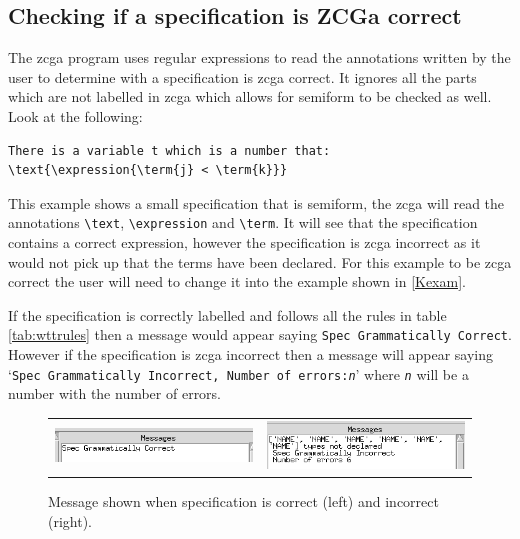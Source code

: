\subsection{Checking if a specification is ZCGa correct}

The \gls{zcga} program uses regular expressions to read the annotations written
by the user to determine with a specification is \gls{zcga} correct. It ignores
all the parts which are not labelled in \gls{zcga} which allows for
\gls{semiform} to be checked as well. Look at the following:

\begin{exam}
\begin{verbatim}
There is a variable t which is a number that:
\text{\expression{\term{j} < \term{k}}}
\end{verbatim}
\end{exam}

This example shows a small specification that is \gls{semiform}, the \gls{zcga}
will read the annotations \verb|\text|, \verb|\expression| and \verb|\term|. It
will see that the specification contains a correct expression, however the
specification is \gls{zcga} incorrect as it would not pick up that the terms
have been declared. For this example to be \gls{zcga} correct the user will need
to change it into the example shown in \ref{Kexam}.

If the specification is correctly labelled and follows all the rules in table
\ref{tab:wttrules} then a message would appear saying \texttt{Spec Grammatically
Correct}. However if the specification is \gls{zcga} incorrect then a message
will appear saying `\texttt{Spec Grammatically Incorrect, Number of
errors:\emph{n}}' where \texttt{\emph{n}} will be a number with the number of
errors.

\begin{figure}[H]
\begin{tabular}{c c}
\includegraphics[scale=0.55]{Figures/zcga/zcgacorrect.png} 
& \includegraphics[scale=0.55]{Figures/zcga/zcgaincorrect.png}
\end{tabular}
\caption{Message shown when specification is correct (left) and incorrect (right).\label{fig:correctandincorrect}}
\end{figure}

